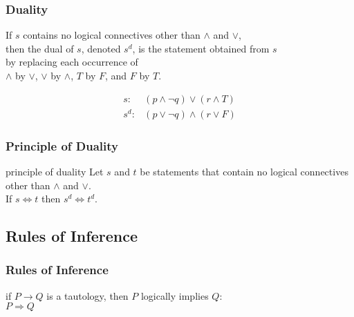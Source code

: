 \documentclass[dvipsnames]{beamer}
\begin{document}
\begin{frame}
  \frametitle{Duality}

  \begin{definition}
    If $s$ contains no logical connectives other than $\wedge$ and $\vee$,\\
    then the \alert{dual} of $s$, denoted $s^d$, is the statement obtained
    from $s$\\
    by replacing each occurrence of\\
    $\wedge$ by $\vee$, $\vee$ by $\wedge$, $T$ by $F$, and $F$ by $T$.
  \end{definition}

  \pause
  \begin{example}
    \begin{eqnarray*}
      s:   & (p \wedge \neg q) \vee (r \wedge T)\\
      s^d: & (p \vee \neg q) \wedge (r \vee F)
    \end{eqnarray*}
  \end{example}
\end{frame}

\begin{frame}
  \frametitle{Principle of Duality}

  \begin{block}{principle of duality}
    Let $s$ and $t$ be statements that contain no logical connectives\\
    other than $\wedge$ and $\vee$.\\
    If $s \Leftrightarrow t$ then $s^d \Leftrightarrow t^d$.
  \end{block}
\end{frame}

\subsection{Rules of Inference}

\begin{frame}
  \frametitle{Rules of Inference}

  \begin{definition}
    if $P \rightarrow Q$ is a tautology, then $P$ \alert{logically implies} $Q$:\\
    $P \Rightarrow Q$
  \end{definition}
\end{frame}
\end{document}

